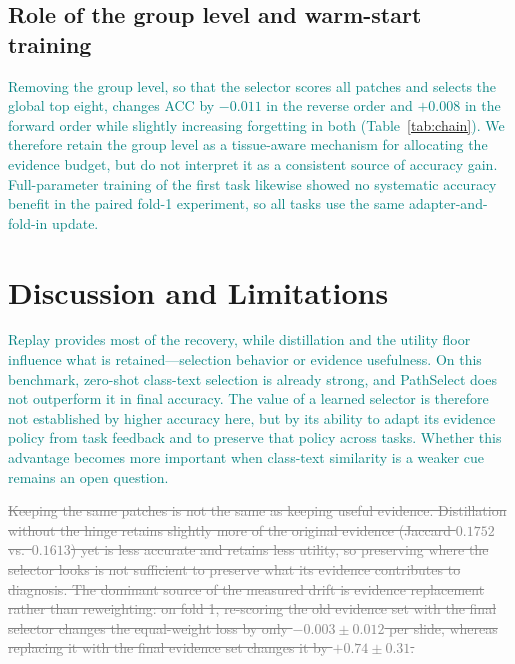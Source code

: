 \documentclass{article}
\newif\ifmarkup \markuptrue
\newcommand{\repc}[3]{\ifmarkup\textcolor{gray}{\sout{#2}}\textcolor{#1}{#3}\else#3\fi}
\newcommand{\repG}[2]{\repc{teal}{#1}{#2}}    %
\begin{document}
\subsection{Role of the group level and warm-start training}
\label{ssec:order}

\repG{}{Removing the group level, so that the selector scores all patches and selects the global top eight, changes ACC by $-0.011$ in the reverse order and $+0.008$ in the forward order while slightly increasing forgetting in both (Table~\ref{tab:chain}). We therefore retain the group level as a tissue-aware mechanism for allocating the evidence budget, but do not interpret it as a consistent source of accuracy gain. Full-parameter training of the first task likewise showed no systematic accuracy benefit in the paired fold-1 experiment, so all tasks use the same adapter-and-fold-in update.}

\FloatBarrier
\section{Discussion and Limitations}
\label{sec:discussion}

\repG{}{Replay provides most of the recovery, while distillation and the utility floor influence what is retained---selection behavior or evidence usefulness. On this benchmark, zero-shot class-text selection is already strong, and PathSelect does not outperform it in final accuracy. The value of a learned selector is therefore not established by higher accuracy here, but by its ability to adapt its evidence policy from task feedback and to preserve that policy across tasks. Whether this advantage becomes more important when class-text similarity is a weaker cue remains an open question.}

\repG{Keeping the same patches is not the same as keeping useful evidence. Distillation without the hinge retains slightly more of the original evidence (Jaccard $0.1752$ vs.\ $0.1613$) yet is less accurate and retains less utility, so preserving where the selector looks is not sufficient to preserve what its evidence contributes to diagnosis. The dominant source of the measured drift is evidence replacement rather than reweighting: on fold 1, re-scoring the old evidence set with the final selector changes the equal-weight loss by only $-0.003{\pm}0.012$ per slide, whereas replacing it with the final evidence set changes it by $+0.74{\pm}0.31$.}{}
\end{document}
